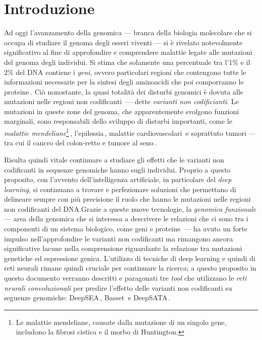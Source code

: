 \chapter{Introduzione}\label{chp:introduction}

Ad oggi l'avanzamento della genomica — branca della biologia molecolare che si occupa di studiare il genoma degli esseri viventi — si è rivelato notevolmente significativo al fine di approfondire e comprendere malattie legate alle mutazioni del genoma degli individui. Si stima che solamente una percentuale tra l'1\% e il 2\% del DNA contiene i \textsl{geni}, ovvero particolari regioni che contengono tutte le informazioni necessarie per la sintesi degli aminoacidi che poi comporranno le proteine\,\cite{sahu2011identification}. Ciò nonostante, la quasi totalità dei disturbi genomici è dovuta alle mutazioni nelle regioni non codificanti\,\cite{zhang2015non} — dette \textsl{varianti non codificianti}. Le mutazioni in queste zone del genoma, che apparentemente svolgono funzioni marginali, sono responsabili dello sviluppo di disturbi importanti, come le \textsl{malattie mendeliane}\footnote{Le malattie mendeliane, causate dalla mutazione di un singolo gene, includono la fibrosi cistica e il morbo di Huntington.}\,\cite{french2020role, chial2008mendelian}, l'epilessia\,\cite{pagni2022non}, malattie cardiovascolari\,\cite{kapoor2014enhancer, zhang2015non} e soprattuto tumori — tra cui il cancro del colon-retto e tumore al seno\,\cite{khurana2016role, tian2019systematic, bojesen2013multiple, michailidou2017association}.

Risulta quindi vitale continuare a studiare gli effetti che le varianti non codificanti in sequenze genomiche hanno sugli individui. Proprio a questo proposito, con l'avvento dell'intelligenza artificiale, in particolare del \textsl{deep learning}, si continuano a trovare e perfezionare soluzioni che permettano di delineare sempre con più precisione il ruolo che hanno le mutazioni nelle regioni non codificanti del DNA.\@ Grazie a queste nuove tecnologie, la \textsl{genomica funzionale} — area della genomica che si interessa a descrivere le relazioni che ci sono tra i componenti di un sistema biologico, come geni e proteine\,\cite{caudai2021ai} — ha avuto un forte impulso nell'approfondire le varianti non codificanti ma rimangono ancora significative lacune nella comprensione riguardante la relazione tra mutazioni genetiche ed espressione genica. L'utilizzo di tecniche di deep learning e quindi di reti neurali rimane quindi cruciale per continuare la ricerca; a questo proposito in questo documento verranno descritti e paragonati tre \textsl{tool} che utilizzano le \textsl{reti neurali convoluzionali} per predire l'effetto delle varianti non codificanti su seguenze genomiche: DeepSEA\,\cite{zhou2015predicting}, Basset\,\cite{kelley2016basset} e DeepSATA\,\cite{ma2023deepsata}.




